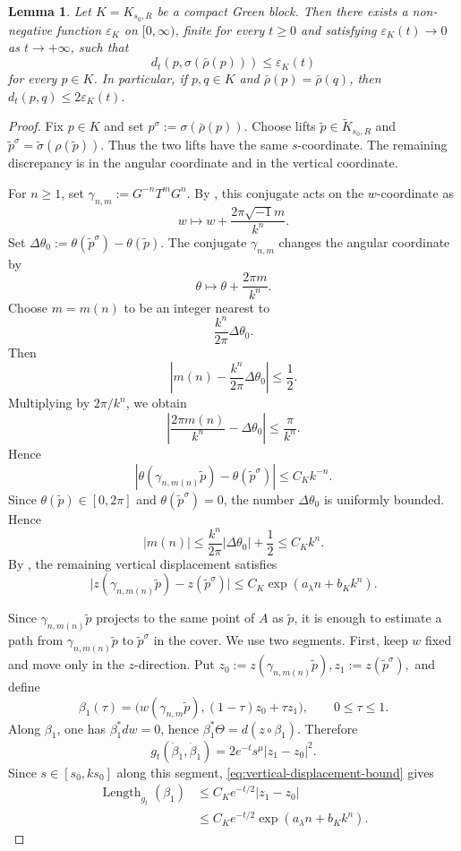 \documentclass[12pt]{amsart}
\numberwithin{equation}{section}
\newtheorem{lema}{Lemma}
\theoremstyle{remark}
\theoremstyle{definition}
\begin{document}
\begin{lema}
\label{lem:fibre-collapse}
Let $K=K_{s_0,R}$ be a compact Green block. Then there exists a non-negative function $\varepsilon_K$ on $[0,\infty)$, finite for every $t\ge0$ and satisfying $\varepsilon_K(t)\to0$ as $t\to+\infty$, such that
\begin{equation*}
d_t(p,\sigma(\bar\rho(p)))\leq \varepsilon_K(t)
\end{equation*}
for every $p\in K$. In particular, if $p,q\in K$ and
$\bar\rho(p)=\bar\rho(q)$, then
$
d_t(p,q)\leq 2\varepsilon_K(t).
 $
\end{lema}

\begin{proof}
Fix $p\in K$ and set $p^\sigma:=\sigma(\bar\rho(p))$.
Choose lifts $\tilde p\in\widetilde K_{s_0,R}$ and
$\tilde p^\sigma=\widetilde\sigma(\rho(\tilde p))$. Thus the two lifts have
the same $s$-coordinate. The remaining discrepancy is in the angular
coordinate and in the vertical coordinate.

For $n\geq1$, set $\gamma_{n,m}:=G^{-n}T^mG^n$.
By , this conjugate acts on the $w$-coordinate
as
$$
w\longmapsto w+\frac{2\pi\sqrt{-1}m}{k^n}.
$$
Set $\Delta\theta_0:=\theta(\tilde p^\sigma)-\theta(\tilde p)$.
The conjugate $\gamma_{n,m}$ changes the angular coordinate by
$$
\theta\longmapsto \theta+\frac{2\pi m}{k^n}.
$$
Choose $m=m(n)$ to be an integer nearest to
$$
\frac{k^n}{2\pi}\Delta\theta_0.
$$
Then
$$
\left|
m(n)-\frac{k^n}{2\pi}\Delta\theta_0
\right|
\leq
\frac12.
$$
Multiplying by $2\pi/k^n$, we obtain
$$
\left|
\frac{2\pi m(n)}{k^n}
-
\Delta\theta_0
\right|
\leq
\frac{\pi}{k^n}.
$$
Hence
$$
\left|
\theta( \gamma_{n,m(n)}\tilde p)-\theta(\tilde p^\sigma)
\right|
\leq
C_K k^{-n}.
$$
Since $\theta(\tilde p)\in[0,2\pi]$ and
$\theta(\tilde p^\sigma)=0$, the number $\Delta\theta_0$ is uniformly
bounded. Hence
$$
|m(n)|
\leq
\frac{k^n}{2\pi}|\Delta\theta_0|+\frac12
\leq
C_K k^n.
$$
By , the remaining vertical displacement
satisfies
\begin{equation}
\label{eq:vertical-displacement-bound}
\bigl|
z( \gamma_{n,m(n)}\tilde p)-z(\tilde p^\sigma)
\bigr|
\leq
C_K\exp(a_\lambda n+b_Kk^n).
\end{equation}

Since $ \gamma_{n,m(n)}\tilde p$ projects to the same point of $A$ as
$\tilde p$, it is enough to estimate a path from
$ \gamma_{n,m(n)}\tilde p$ to $\tilde p^\sigma$ in the cover. We use two
segments.
First, keep $w$ fixed and move only in the $z$-direction. Put
$
z_0:=z( \gamma_{n,m(n)}\tilde p), 
z_1:=z(\tilde p^\sigma),
$
and define
$$
\beta_1(\tau)
=
\bigl(w(\gamma_{n,m}\tilde p),(1-\tau)z_0+\tau z_1\bigr),
\qquad
0\leq\tau\leq1.
$$
Along $\beta_1$, one has $\beta_1^*dw=0$, hence $\beta_1^*\Theta=d(z\circ\beta_1)$. Therefore
$$
g_t(\dot\beta_1,\dot\beta_1)
=
2e^{-t}s^\mu|z_1-z_0|^2.
$$
Since $s\in[s_0,ks_0]$ along this segment,
\eqref{eq:vertical-displacement-bound} gives
\begin{align*}
\operatorname{Length}_{g_t}(\beta_1)
&\leq
C_K e^{-t/2}|z_1-z_0|\\
&\leq
C_K e^{-t/2}\exp(a_\lambda n+b_Kk^n).
\end{align*}


\end{proof}
\end{document}
